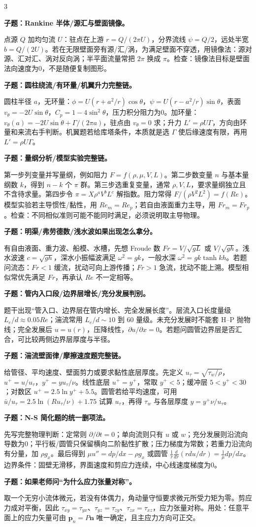 \documentclass[a4paper]{article}
\newcommand{\qt}[1]{\vspace{0.04pt}\colorbox{Q}{\parbox{\dimexpr\linewidth-2\fboxsep}{\color{white}\bfseries #1}}\par}
\newcommand{\ans}[1]{\colorbox{G}{\parbox{\dimexpr\linewidth-2\fboxsep}{#1}}\par}
\begin{document}
\begin{multicols}{3}
\qt{子题：Rankine 半体/源汇与壁面镜像。}
\ans{点源 $Q$ 加均匀流 $U$：驻点在上游 $r=Q/(2\pi U)$，分界流线 $\psi=Q/2$，远处半宽 $b=Q/(2U)$。若在无限壁面旁有源/汇/涡，为满足壁面不穿透，用镜像法：源对源、汇对汇、涡对反向涡；半平面流量常把 $2\pi$ 换成 $\pi$。检查：镜像法目标是壁面法向速度为0，不是随便复制图形。}
\qt{子题：圆柱绕流/有环量/机翼升力完整链。}
\ans{圆柱半径 $a$，无环量：$\phi=U(r+a^2/r)\cos\theta$，$\psi=U(r-a^2/r)\sin\theta$，表面 $v_\theta=-2U\sin\theta$，$C_p=1-4\sin^2\theta$，压力积分阻力为0。加环量：$v_\theta(a)=-2U\sin\theta+\Gamma/(2\pi a)$，驻点由 $v_\theta=0$ 求；升力 $L'=\rho U\Gamma$，方向由环量和来流右手判断。机翼题若给库塔条件，本质就是选 $\Gamma$ 使后缘速度有限，再用 $L'=\rho U\Gamma$。}
\qt{子题：量纲分析/模型实验完整链。}
\ans{第一步列变量并写量纲，例如阻力 $F=f(\rho,\mu,V,L)$。第二步数变量 $n$ 与基本量纲数 $k$，得到 $n-k$ 个 $\pi$ 群。第三步选重复变量，通常 $\rho,V,L$，要求量纲独立且不含待求量。第四步令 $\pi=X\rho^aV^bL^c$ 解指数。阻力常得 $F/(\rho V^2L^2)=f(Re)$。模型实验若主导惯性/黏性，用 $Re_m=Re_p$；若自由液面重力主导，用 $Fr_m=Fr_p$。检查：不同相似准则可能不能同时满足，必须说明取主导物理。}
\qt{子题：明渠/弗劳德数/浅水波如果出现怎么拿分。}
\ans{有自由液面、重力波、船模、水槽，先想 Froude 数 $Fr=V/\sqrt{gL}$ 或 $V/\sqrt{gh}$。浅水波速 $c=\sqrt{gh}$，深水小振幅波满足 $\omega^2=gk$，一般水深 $\omega^2=gk\tanh kh$。若题问流态：$Fr<1$ 缓流，扰动可向上游传播；$Fr>1$ 急流，扰动不能上溯。模型相似常优先满足 $Fr$，再承认 $Re$ 不一定相等。}
\qt{子题：管内入口段/边界层增长/充分发展判别。}
\ans{题干出现“管入口、边界层在管内增长、完全发展长度”。层流入口长度量级 $L_e/d\approx0.05Re$；湍流常用 $L_e/d\sim10$ 到 $60$ 量级。未充分发展时不能套 H--P 抛物线；完全发展后 $u=u(r)$，压降线性，$\partial u/\partial x=0$。若题问圆管边界层是否汇合，可比较两侧边界层厚度与半径。}
\qt{子题：湍流壁面律/摩擦速度题完整链。}
\ans{给管径、平均速度、壁面剪力或要求黏性底层厚度。先定义 $u_\tau=\sqrt{\tau_w/\rho}$，$u^+=u/u_\tau$，$y^+=yu_\tau/\nu$。线性底层 $u^+=y^+$，常取 $y^+<5$；缓冲层 $5<y^+<30$；对数区 $u^+=2.5\ln y^+ +5.5$。圆管若给平均速度，可用 $\bar u/u_\tau=2.5\ln(Ru_\tau/\nu)+1.75$ 试算 $u_\tau$，再得 $\tau_w$ 与各层厚度 $y= y^+\nu/u_\tau$。}
\qt{子题：N-S 简化题的统一删项法。}
\ans{先写完整物理判断：定常则 $\partial/\partial t=0$；单向流则只有 $u$ 或 $w$；充分发展则沿流向导数为0；平行板/圆管只保留横向二阶黏性扩散；压力梯度为常数；若重力沿流向有分量，加 $\rho g_x$。最后得到 $\mu u''=dp/dx-\rho g_x$ 或圆管 $\frac1r\frac d{dr}(rdu/dr)=\frac1\mu dp/dx$。边界条件：固壁无滑移，界面速度和剪应力连续，中心线速度梯度为0。}
\qt{子题：如果老师问“为什么应力张量对称”。}
\ans{取一个无穷小流体微元，若没有体偶力，角动量守恒要求微元所受力矩为零。剪应力成对平衡，因此 $\tau_{xy}=\tau_{yx}$、$\tau_{yz}=\tau_{zy}$、$\tau_{zx}=\tau_{xz}$，应力张量对称。用处：任意平面上的应力矢量可由 $\bm p_n=P\bm n$ 唯一确定，且主应力方向可正交。}


\end{multicols}
\end{document}
